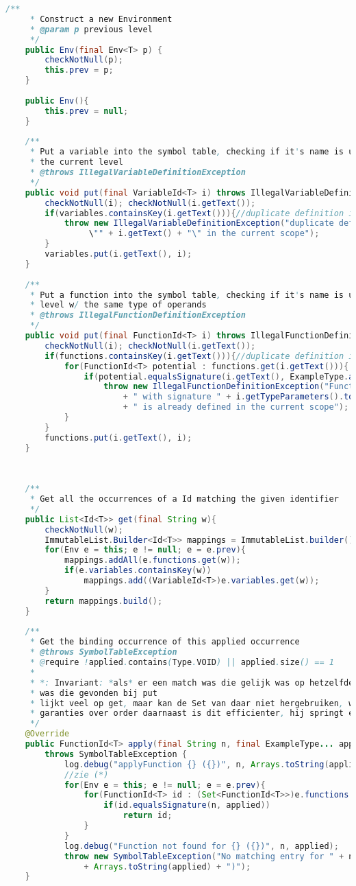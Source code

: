 \begin{lstlisting}[language=Java]
	/**
	 * Construct a new Environment
	 * @param p previous level
	 */
	public Env(final Env<T> p) {
		checkNotNull(p);
		this.prev = p; 
	}
	
	public Env(){
		this.prev = null;
	}
	
	/**
	 * Put a variable into the symbol table, checking if it's name is unique at 
     * the current level
	 * @throws IllegalVariableDefinitionException 
	 */
	public void put(final VariableId<T> i) throws IllegalVariableDefinitionException{
		checkNotNull(i); checkNotNull(i.getText());
		if(variables.containsKey(i.getText())){//duplicate definition in this scope level
			throw new IllegalVariableDefinitionException("duplicate definition of variable
                 \"" + i.getText() + "\" in the current scope");
		}
		variables.put(i.getText(), i);
	}
	
	/**
	 * Put a function into the symbol table, checking if it's name is unique at the current 
     * level w/ the same type of operands
	 * @throws IllegalFunctionDefinitionException 
	 */
	public void put(final FunctionId<T> i) throws IllegalFunctionDefinitionException{
		checkNotNull(i); checkNotNull(i.getText());
		if(functions.containsKey(i.getText())){//duplicate definition in this scope level
			for(FunctionId<T> potential : functions.get(i.getText())){
				if(potential.equalsSignature(i.getText(), ExampleType.asArray(i.getTypeParameters())))
					throw new IllegalFunctionDefinitionException("Function " + i.getText() 
                        + " with signature " + i.getTypeParameters().toString() 
                        + " is already defined in the current scope");		
			}
		}
		functions.put(i.getText(), i);
	}
	
	
	
	/**
	 * Get all the occurrences of a Id matching the given identifier
	 */
	public List<Id<T>> get(final String w){
		checkNotNull(w);
		ImmutableList.Builder<Id<T>> mappings = ImmutableList.builder();
		for(Env e = this; e != null; e = e.prev){
			mappings.addAll(e.functions.get(w));
			if(e.variables.containsKey(w))
				mappings.add((VariableId<T>)e.variables.get(w));
		}
		return mappings.build();
	}
	
	/**
	 * Get the binding occurrence of this applied occurrence
	 * @throws SymbolTableException 
	 * @require !applied.contains(Type.VOID) || applied.size() == 1
	 * 
	 * *: Invariant: *als* er een match was die gelijk was op hetzelfde niveau, 
     * was die gevonden bij put
	 * lijkt veel op get, maar kan de Set van daar niet hergebruiken, want geen 
     * garanties over order daarnaast is dit efficienter, hij springt er eerder uit
	 */
	@Override
	public FunctionId<T> apply(final String n, final ExampleType... applied) 
        throws SymbolTableException {
		    log.debug("applyFunction {} ({})", n, Arrays.toString(applied));
		    //zie (*)
		    for(Env e = this; e != null; e = e.prev){
			    for(FunctionId<T> id : (Set<FunctionId<T>>)e.functions.get(n)){
			    	if(id.equalsSignature(n, applied))
			    		return id;
			    }
		    }
		    log.debug("Function not found for {} ({})", n, applied);
		    throw new SymbolTableException("No matching entry for " + n + " ("  
                + Arrays.toString(applied) + ")");
	}
	

\end{lstlisting}
